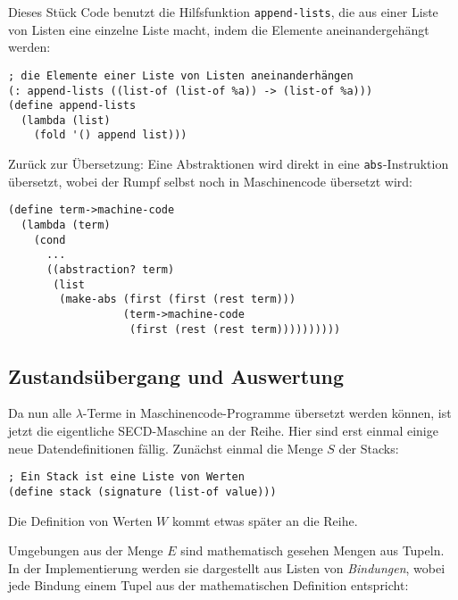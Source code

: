 %
Dieses Stück Code benutzt die Hilfsfunktion \lstinline{append-lists}, die
aus einer Liste von Listen eine einzelne Liste macht, indem die
Elemente aneinandergehängt werden:
%
\begin{lstlisting}
; die Elemente einer Liste von Listen aneinanderhängen
(: append-lists ((list-of (list-of %a)) -> (list-of %a)))
(define append-lists
  (lambda (list)
    (fold '() append list)))
\end{lstlisting}
%
Zurück zur Übersetzung: Eine Abstraktionen wird direkt in eine
\lstinline{abs}-Instruktion übersetzt, wobei der Rumpf selbst
noch in Maschinencode übersetzt wird:
%
\begin{lstlisting}
(define term->machine-code
  (lambda (term)
    (cond
      ...
      ((abstraction? term)
       (list
        (make-abs (first (first (rest term)))
                  (term->machine-code
                   (first (rest (rest term))))))))))
\end{lstlisting}
%

\subsection{Zustandsübergang und Auswertung}
\label{sec:secd-transition}

Da nun alle $\lambda$-Terme in Maschinencode-Programme übersetzt
werden können, ist jetzt die eigentliche SECD-Maschine an der Reihe.
Hier sind erst einmal einige neue Datendefinitionen fällig.  Zunächst
einmal die Menge $S$ der Stacks:
%
\begin{lstlisting}
; Ein Stack ist eine Liste von Werten
(define stack (signature (list-of value)))
\end{lstlisting}
%
Die Definition von Werten $W$ kommt etwas später an die Reihe.

Umgebungen aus der Menge $E$ sind mathematisch gesehen Mengen aus
Tupeln.  In der Implementierung werden sie dargestellt aus Listen von
\textit{Bindungen}, wobei jede Bindung einem Tupel aus
der mathematischen Definition entspricht:

